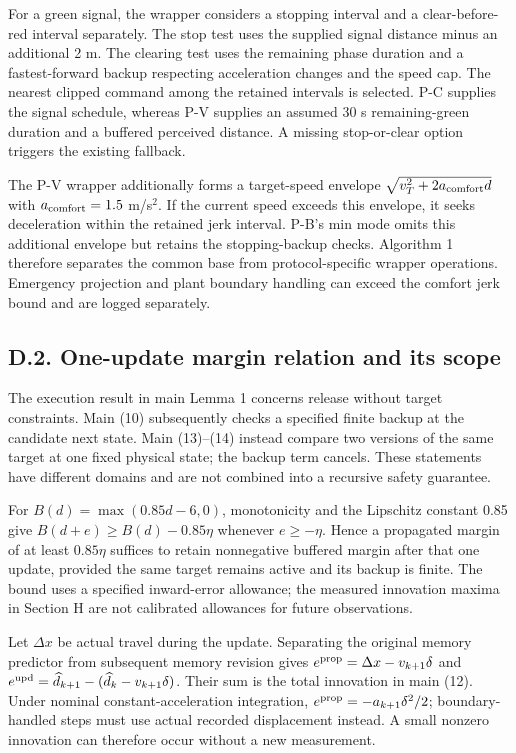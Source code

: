\documentclass[letterpaper,journal,onecolumn]{IEEEtran}
\begin{document}
For a green signal, the wrapper considers a stopping interval and a clear-before-red interval separately. The stop test uses the supplied signal distance minus an additional 2 m. The clearing test uses the remaining phase duration and a fastest-forward backup respecting acceleration changes and the speed cap. The nearest clipped command among the retained intervals is selected. P-C supplies the signal schedule, whereas P-V supplies an assumed 30 s remaining-green duration and a buffered perceived distance. A missing stop-or-clear option triggers the existing fallback.

The P-V wrapper additionally forms a target-speed envelope \(\sqrt{v_T^2+2a_{\rm comfort}d}\) with \(a_{\rm comfort}=1.5\) m/s\(^2\). If the current speed exceeds this envelope, it seeks deceleration within the retained jerk interval. P-B's min mode omits this additional envelope but retains the stopping-backup checks. Algorithm 1 therefore separates the common base from protocol-specific wrapper operations. Emergency projection and plant boundary handling can exceed the comfort jerk bound and are logged separately.

\subsection*{D.2. One-update margin relation and its scope}

The execution result in main Lemma 1 concerns release without target constraints. Main (10) subsequently checks a specified finite backup at the candidate next state. Main (13)--(14) instead compare two versions of the same target at one fixed physical state; the backup term cancels. These statements have different domains and are not combined into a recursive safety guarantee.

For \(B(d)=\max(0.85d-6,0)\), monotonicity and the Lipschitz constant 0.85 give \(B(d+e)\ge B(d)-0.85\eta\) whenever \(e\ge-\eta\). Hence a propagated margin of at least \(0.85\eta\) suffices to retain nonnegative buffered margin after that one update, provided the same target remains active and its backup is finite. The bound uses a specified inward-error allowance; the measured innovation maxima in Section H are not calibrated allowances for future observations.

Let \(\Delta x\) be actual travel during the update. Separating the original memory predictor from subsequent memory revision gives \(e^{\rm prop}=\Delta x-v_{k+1}\delta\) and \(e^{\rm upd}=\widehat d_{k+1}-(\widehat d_k-v_{k+1}\delta)\). Their sum is the total innovation in main (12). Under nominal constant-acceleration integration, \(e^{\rm prop}=-a_{k+1}\delta^2/2\); boundary-handled steps must use actual recorded displacement instead. A small nonzero innovation can therefore occur without a new measurement.
\end{document}
